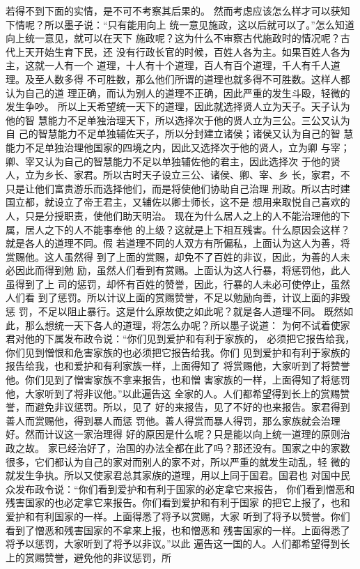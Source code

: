 \documentclass[12pt,UTF8]{ctexbook}
\begin{document}
若得不到下面的实情，是不可不考察其后果的。 
然而考虑应该怎么样才可以获知下情呢？所以墨子说：“只有能用向上 
统一意见施政，这以后就可以了。”怎么知道向上统一意见，就可以在天下 
施政呢？这为什么不审察古代施政时的情况呢？古代上天开始生育下民，还 
没有行政长官的时候，百姓人各为主。如果百姓人各为主，这就一人有一个 
道理，十人有十个道理，百人有百个道理，千人有千人道理。及至人数多得 
不可胜数，那么他们所谓的道理也就多得不可胜数。这样人都认为自己的道 
理正确，而认为别人的道理不正确，因此严重的发生斗殴，轻微的发生争吵。 
所以上天希望统一天下的道理，因此就选择贤人立为天子。天子认为他的智 
慧能力不足单独治理天下，所以选择次于他的贤人立为三公。三公又认为自 
己的智慧能力不足单独辅佐天子，所以分封建立诸侯；诸侯又认为自己的智 
慧能力不足单独治理他国家的四境之内，因此又选择次于他的贤人，立为卿 
与宰；卿、宰又认为自己的智慧能力不足以单独辅佐他的君主，因此选择次 
于他的贤人，立为乡长、家君。所以古时天子设立三公、诸侯、卿、宰、乡 
长，家君，不只是让他们富贵游乐而选择他们，而是将使他们协助自己治理 
刑政。所以古时建国立都，就设立了帝王君主，又辅佐以卿士师长，这不是 
想用来取悦自己喜欢的人，只是分授职责，使他们助天明治。 
现在为什么居人之上的人不能治理他的下属，居人之下的人不能事奉他 
的上级？这就是上下相互残害。什么原因会这样？就是各人的道理不同。假 
若道理不同的人双方有所偏私，上面认为这人为善，将赏赐他。这人虽然得 
到了上面的赏赐，却免不了百姓的非议，因此，为善的人未必因此而得到勉 
励，虽然人们看到有赏赐。上面认为这人行暴，将惩罚他，此人虽得到了上 
司的惩罚，却怀有百姓的赞誉，因此，行暴的人未必可使停止，虽然人们看 
到了惩罚。所以计议上面的赏赐赞誉，不足以勉励向善，计议上面的非毁惩 
罚，不足以阻止暴行。这是什么原故使之如此呢？就是各人道理不同。 
既然如此，那么想统一天下各人的道理，将怎么办呢？所以墨子说道： 
为何不试着使家君对他的下属发布政令说：“你们见到爱护和有利于家族的， 
必须把它报告给我，你们见到憎恨和危害家族的也必须把它报告给我。你们 
见到爱护和有利于家族的报告给我，也和爱护和有利家族一样，上面得知了 
将赏赐他，大家听到了将赞誉他。你们见到了憎害家族不拿来报告，也和憎 
害家族的一样，上面得知了将惩罚他，大家听到了将非议他。”以此遍告这 
全家的人。人们都希望得到长上的赏赐赞誉，而避免非议惩罚。所以，见了 
好的来报告，见了不好的也来报告。家君得到善人而赏赐他，得到暴人而惩 
罚他。善人得赏而暴人得罚，那么家族就会治理好。然而计议这一家治理得 
好的原因是什么呢？只是能以向上统一道理的原则治政之故。 
家已经治好了，治国的办法全都在此了吗？那还没有。国家之中的家数 
很多，它们都认为自己的家对而别人的家不对，所以严重的就发生动乱，轻 
微的就发生争执。所以又使家君总其家族的道理，用以上同于国君。国君也 
对国中民众发布政令说：“你们看到爱护和有利于国家的必定拿它来报告， 
你们看到憎恶和残害国家的也必定拿它来报告。你们看到爱护和有利于国家 
的把它上报了，也和爱护和有利国家的一样。上面得悉了将予以赏赐，大家 
听到了将予以赞誉。你们看到了憎恶和残害国家的不拿来上报，也和憎恶和 
残害国家的一样。上面得悉了将予以惩罚，大家听到了将予以非议。”以此 
遍告这一国的人。人们都希望得到长上的赏赐赞誉，避免他的非议惩罚，所 
\end{document}
